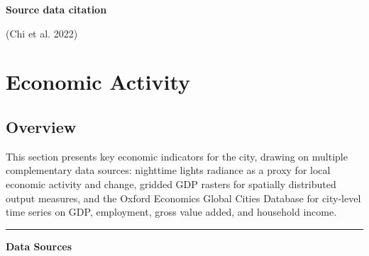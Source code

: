 \documentclass[
  letterpaper,
  DIV=11,
  numbers=noendperiod]{scrreprt}
\begin{document}
\textbf{Source data citation}

(Chi et al. 2022)

\chapter{Economic Activity}\label{economic-activity}

\section{Overview}\label{overview-1}

This section presents key economic indicators for the city, drawing on
multiple complementary data sources: nighttime lights radiance as a
proxy for local economic activity and change, gridded GDP rasters for
spatially distributed output measures, and the Oxford Economics Global
Cities Database for city-level time series on GDP, employment, gross
value added, and household income.

\begin{center}\rule{0.5\linewidth}{0.5pt}\end{center}

\textbf{Data Sources}
\end{document}
